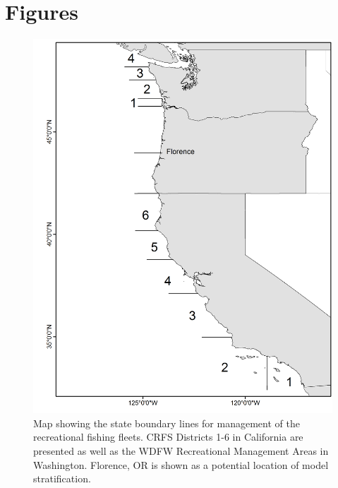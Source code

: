 \documentclass[12pt,]{article}
\begin{document}
\newpage

\section{Figures}\label{figures}

\begin{figure}[htbp]
\centering
\includegraphics{Figures/boundary_map.png}
\caption{Map showing the state boundary lines for management of the
recreational fishing fleets. CRFS Districts 1-6 in California are
presented as well as the WDFW Recreational Management Areas in
Washington. Florence, OR is shown as a potential location of model
stratification. \label{fig:boundary_map}}
\end{figure}
\end{document}
